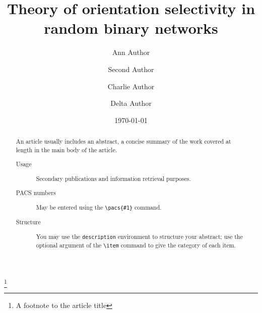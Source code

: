 \documentclass[%
 reprint,
 amsmath,amssymb,
 aps,
]{revtex4-1}
\begin{document}

\title{Theory of orientation selectivity in random binary networks} 
\thanks{A footnote to the article title}%

\author{Ann Author}
\author{Second Author}%
%


\author{Charlie Author}
%
%
\author{Delta Author}
%


\date{\today}%

\begin{abstract}
An article usually includes an abstract, a concise summary of the work
covered at length in the main body of the article. 
\begin{description}
\item[Usage]
Secondary publications and information retrieval purposes.
\item[PACS numbers]
May be entered using the \verb+\pacs{#1}+ command.
\item[Structure]
You may use the \texttt{description} environment to structure your abstract;
use the optional argument of the \verb+\item+ command to give the category of each item. 
\end{description}
\end{abstract}

\maketitle
\end{document}
